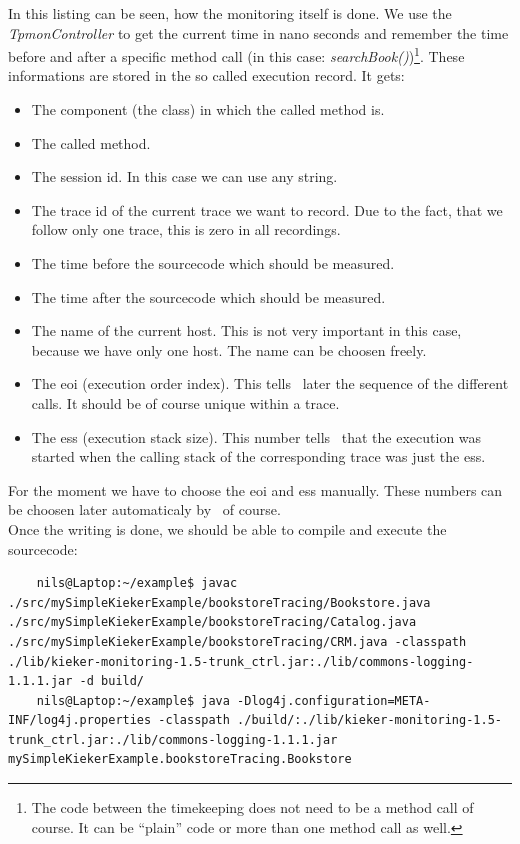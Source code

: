 \documentclass[a4paper, oneside, 11pt]{scrartcl}
\begin{document}
      In this listing can be seen, how the monitoring itself is done. We use the \textit{TpmonController} to get the current time in nano seconds and remember the time before and after a specific method call (in this case: \textit{searchBook()})\footnote{The code between the timekeeping does not need to be a method call of course. It can be ``plain'' code or more than one method call as well.}. These informations are stored in the so called execution record. It gets:
      \begin{itemize}
	\item The component (the class) in which the called method is.
	\item The called method.
	\item The session id. In this case we can use any string.
	\item The trace id of the current trace we want to record. Due to the fact, that we follow only one trace, this is zero in all recordings.
	\item The time before the sourcecode which should be measured.
	\item The time after the sourcecode which should be measured.
	\item The name of the current host. This is not very important in this case, because we have only one host. The name can be choosen freely.
	\item The eoi (execution order index). This tells \Kieker\ later the sequence of the different calls. It should be of course unique within a trace.
	\item The ess (execution stack size). This number tells \Kieker\ that the execution was started when the calling stack of the corresponding trace was just the                
              ess.
      \end{itemize}
      For the moment we have to choose the eoi and ess manually. These numbers can be choosen later automaticaly by \Kieker\ of course.\\
      Once the writing is done, we should be able to compile and execute the sourcecode:
      \setBashListing
      \begin{lstlisting}
	nils@Laptop:~/example$ javac ./src/mySimpleKiekerExample/bookstoreTracing/Bookstore.java ./src/mySimpleKiekerExample/bookstoreTracing/Catalog.java ./src/mySimpleKiekerExample/bookstoreTracing/CRM.java -classpath ./lib/kieker-monitoring-1.5-trunk_ctrl.jar:./lib/commons-logging-1.1.1.jar -d build/
	nils@Laptop:~/example$ java -Dlog4j.configuration=META-INF/log4j.properties -classpath ./build/:./lib/kieker-monitoring-1.5-trunk_ctrl.jar:./lib/commons-logging-1.1.1.jar mySimpleKiekerExample.bookstoreTracing.Bookstore
      \end{lstlisting}
\end{document}
